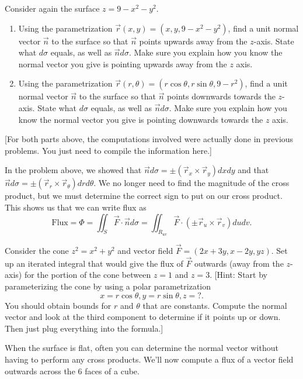 \begin{problem}[Optional]
Consider again the surface $z=9-x^2-y^2$. 
\begin{enumerate}
 \item Using the parametrization $\vec r(x,y) =(x,y,9-x^2-y^2)$, find a unit normal vector $\vec n$ to the surface so that $\vec n$ points upwards away from the $z$-axis. State what $d\sigma$ equals, as well as $\vec n d\sigma$. 
Make sure you explain how you know the normal vector you give is pointing upwards away from the $z$ axis.
 \item Using the parametrization $\vec r(r,\theta) =(r\cos \theta,r\sin\theta ,9-r^2)$, find a unit normal vector $\vec n$ to the surface so that $\vec n$ points downwards towards the $z$-axis. State what $d\sigma$ equals, as well as $\vec n d\sigma$.  
Make sure you explain how you know the normal vector you give is pointing downwards towards the $z$ axis.
\end{enumerate}
[For both parts above, the computations involved were actually done in previous problems. You just need to compile the information here.]
\end{problem}


In the problem above, we showed that $\vec n d\sigma = \pm(\vec r_x\times\vec r_y)dxdy$ and that $\vec n d\sigma = \pm(\vec r_r\times\vec r_\theta)drd\theta$.  We no longer need to find the magnitude of the cross product, but we must determine the correct sign to put on our cross product.  This shows us that we can write flux as 
$$\text{Flux}=\Phi 
= \iint_S \vec F\cdot \vec n d\sigma 
= \iint_{R_{uv}} \vec F\cdot (\pm \vec r_u\times \vec r_v) dudv
.$$



\begin{problem}[Optional]
 Consider the cone $z^2=x^2+y^2$ and vector field $\vec F = (2x+3y, x-2y, yz)$. Set up an iterated integral that would give the flux of $\vec F$ outwards (away from the $z$-axis) for the portion of the cone between $z=1$ and $z=3$. [Hint: Start by  parameterizing the cone by using a polar parametrization $$x=r\cos\theta, y=r\sin\theta, z=?.$$ You should obtain bounds for $r$ and $\theta$ that are constants.  Compute the normal vector and look at the third component to determine if it points up or down.  Then just plug everything into the formula.]
\end{problem}




When the surface is flat, often you can determine the normal vector without having to perform any cross products.  We'll now compute a flux of a vector field outwards across the 6 faces of a cube. 

